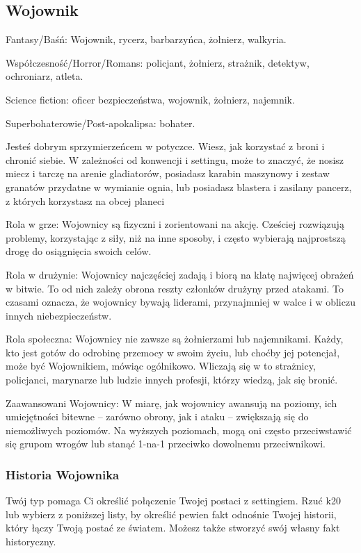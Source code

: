 \subsection{Wojownik}

Fantasy/Baśń: Wojownik, rycerz, barbarzyńca, żołnierz, walkyria.

Współczesność/Horror/Romans: policjant, żołnierz, strażnik, detektyw, ochroniarz, atleta.

Science fiction: oficer bezpieczeństwa, wojownik, żołnierz, najemnik.

Superbohaterowie/Post-apokalipsa: bohater. 

Jesteś dobrym sprzymierzeńcem w potyczce. Wiesz, jak korzystać z broni i chronić siebie. W zależności od konwencji i settingu, może to znaczyć, że nosisz miecz i tarczę na arenie gladiatorów, posiadasz karabin maszynowy i zestaw granatów przydatne w wymianie ognia, lub posiadasz blastera i zasilany pancerz, z których korzystasz na obcej planeci

Rola w grze: Wojownicy są fizyczni i zorientowani na akcję. Cześciej rozwiązują problemy, korzystając z siły, niż na inne sposoby, i często wybierają najprostszą drogę do osiągnięcia swoich celów. 

Rola w drużynie: Wojownicy najczęściej zadają i biorą na klatę najwięcej obrażeń w bitwie. To od nich zależy obrona reszty członków drużyny przed atakami. To czasami oznacza, że wojownicy bywają liderami, przynajmniej w walce i w obliczu innych niebezpieczeństw.

Rola społeczna: Wojownicy nie zawsze są żołnierzami lub najemnikami. Każdy, kto jest gotów do odrobinę przemocy w swoim życiu, lub choćby jej potencjał, może być Wojownikiem, mówiąc ogólnikowo. Wliczają się w to strażnicy, policjanci, marynarze lub ludzie innych profesji, którzy wiedzą, jak się bronić.

Zaawansowani Wojownicy: W miarę, jak wojownicy awansują na poziomy, ich umiejętności bitewne – zarówno obrony, jak i ataku – zwiększają się do niemożliwych poziomów. Na wyższych poziomach, mogą oni często przeciwstawić się grupom wrogów lub stanąć 1-na-1 przeciwko dowolnemu przeciwnikowi.

\subsubsection{Historia Wojownika}

Twój typ pomaga Ci określić połączenie Twojej postaci z settingiem. Rzuć k20 lub wybierz z poniższej listy, by określić pewien fakt odnośnie Twojej historii, który łączy Twoją postać ze światem. Możesz także stworzyć swój własny fakt historyczny.

